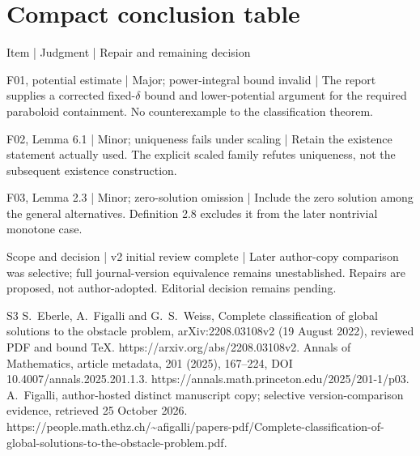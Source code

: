 \documentclass[10pt]{article}
\begin{document}
\section*{Compact conclusion table}
Item | Judgment | Repair and remaining decision\par
F01, potential estimate | Major; power-integral bound invalid | The report supplies a corrected fixed-\(\delta\) bound and lower-potential argument for the required paraboloid containment. No counterexample to the classification theorem.\par
F02, Lemma 6.1 | Minor; uniqueness fails under scaling | Retain the existence statement actually used. The explicit scaled family refutes uniqueness, not the subsequent existence construction.\par
F03, Lemma 2.3 | Minor; zero-solution omission | Include the zero solution among the general alternatives. Definition 2.8 excludes it from the later nontrivial monotone case.\par
Scope and decision | v2 initial review complete | Later author-copy comparison was selective; full journal-version equivalence remains unestablished. Repairs are proposed, not author-adopted. Editorial decision remains pending.\par
S3 S. Eberle, A. Figalli and G. S. Weiss, Complete classification of global solutions to the obstacle problem, arXiv:2208.03108v2 (19 August 2022), reviewed PDF and bound TeX. https://arxiv.org/abs/2208.03108v2. Annals of Mathematics, article metadata, 201 (2025), 167–224, DOI 10.4007/annals.2025.201.1.3. https://annals.math.princeton.edu/2025/201-1/p03. A. Figalli, author-hosted distinct manuscript copy; selective version-comparison evidence, retrieved 25 October 2026. https://people.math.ethz.ch/\textasciitilde{}afigalli/papers-pdf/Complete-classification-of-global-solutions-to-the-obstacle-problem.pdf.\par
\end{document}
